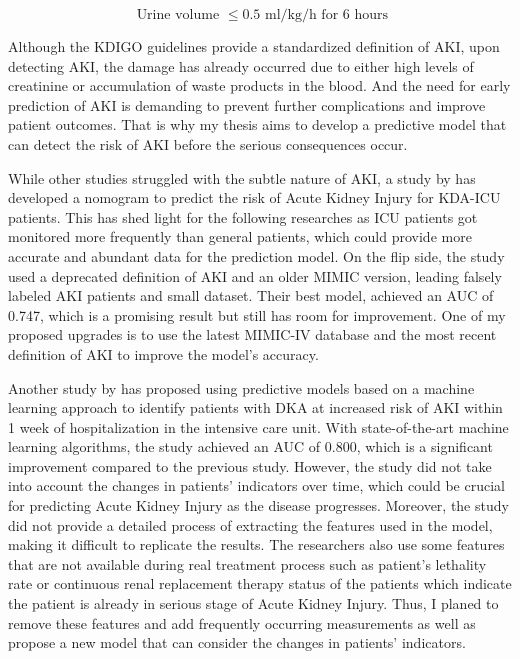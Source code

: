 \documentclass[../main.tex]{subfiles}
\begin{document}
\begin{equation}
    \text{ Urine volume } \le 0.5 \text{ ml/kg/h for 6 hours}
\end{equation}

Although the KDIGO guidelines provide a standardized definition of AKI, upon detecting AKI, the damage has already occurred due to either high levels of creatinine or accumulation of waste products in the blood.
And the need for early prediction of AKI is demanding to prevent further complications and improve patient outcomes.
That is why my thesis aims to develop a predictive model that can detect the risk of AKI before the serious consequences occur.

While other studies struggled with the subtle nature of AKI, a study by \cite{chen2021nomogram} has developed a nomogram to predict the risk of Acute Kidney Injury for KDA-ICU patients.
This has shed light for the following researches as ICU patients got monitored more frequently than general patients, which could provide more accurate and abundant data for the prediction model.
On the flip side, the study used a deprecated definition of AKI and an older MIMIC version, leading falsely labeled AKI patients and small dataset.
Their best model, achieved an AUC of 0.747, which is a promising result but still has room for improvement.
One of my proposed upgrades is to use the latest MIMIC-IV database and the most recent definition of AKI to improve the model's accuracy.

Another study by \cite{goceri2021predicting} has proposed using predictive models based on a machine learning approach to identify patients with DKA at increased risk of AKI within 1 week of hospitalization in the intensive care unit.
With state-of-the-art machine learning algorithms, the study achieved an AUC of 0.800, which is a significant improvement compared to the previous study.
However, the study did not take into account the changes in patients' indicators over time, which could be crucial for predicting Acute Kidney Injury as the disease progresses. 
Moreover, the study did not provide a detailed process of extracting the features used in the model, making it difficult to replicate the results.
The researchers also use some features that are not available during real treatment process such as patient's lethality rate or continuous renal replacement therapy status of the patients which indicate the patient is already in serious stage of Acute Kidney Injury.
Thus, I planed to remove these features and add frequently occurring measurements as well as propose a new model that can consider the changes in patients' indicators.
\end{document}

